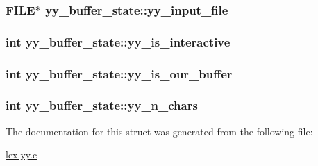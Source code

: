 \subsubsection[{\texorpdfstring{yy\+\_\+input\+\_\+file}{yy_input_file}}]{\setlength{\rightskip}{0pt plus 5cm}F\+I\+LE$\ast$ yy\+\_\+buffer\+\_\+state\+::yy\+\_\+input\+\_\+file}\hypertarget{structyy__buffer__state_a4843d1422e3276b636d475a3095bd948}{}\label{structyy__buffer__state_a4843d1422e3276b636d475a3095bd948}
\subsubsection[{\texorpdfstring{yy\+\_\+is\+\_\+interactive}{yy_is_interactive}}]{\setlength{\rightskip}{0pt plus 5cm}int yy\+\_\+buffer\+\_\+state\+::yy\+\_\+is\+\_\+interactive}\hypertarget{structyy__buffer__state_abf5c70eea75581b58c0ee7bd31b14490}{}\label{structyy__buffer__state_abf5c70eea75581b58c0ee7bd31b14490}
\subsubsection[{\texorpdfstring{yy\+\_\+is\+\_\+our\+\_\+buffer}{yy_is_our_buffer}}]{\setlength{\rightskip}{0pt plus 5cm}int yy\+\_\+buffer\+\_\+state\+::yy\+\_\+is\+\_\+our\+\_\+buffer}\hypertarget{structyy__buffer__state_a80ce2431c70dc4f89ced487f18449465}{}\label{structyy__buffer__state_a80ce2431c70dc4f89ced487f18449465}
\subsubsection[{\texorpdfstring{yy\+\_\+n\+\_\+chars}{yy_n_chars}}]{\setlength{\rightskip}{0pt plus 5cm}int yy\+\_\+buffer\+\_\+state\+::yy\+\_\+n\+\_\+chars}\hypertarget{structyy__buffer__state_a06406208824817acfec2183b79080945}{}\label{structyy__buffer__state_a06406208824817acfec2183b79080945}


The documentation for this struct was generated from the following file\+:\begin{DoxyCompactItemize}
\item 
\hyperlink{lex_8yy_8c}{lex.\+yy.\+c}\end{DoxyCompactItemize}
